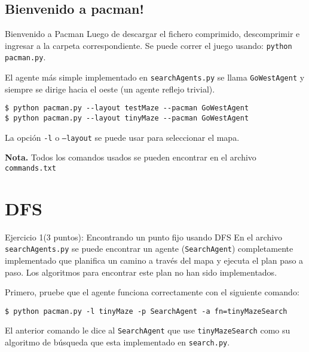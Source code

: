 \documentclass[10pt]{beamer}
\begin{document}
\subsection{Bienvenido a pacman!}

\begin{frame}[fragile]{Bienvenido a Pacman}
    Luego de descargar el fichero comprimido, descomprimir e ingresar a la carpeta correspondiente. 
Se puede correr el juego usando: \texttt{python pacman.py}.

El agente más simple implementado en \texttt{searchAgents.py} se llama \texttt{GoWestAgent} y siempre 
se dirige hacia el oeste (un agente reflejo trivial). 

\begin{lstlisting}
$ python pacman.py --layout testMaze --pacman GoWestAgent
$ python pacman.py --layout tinyMaze --pacman GoWestAgent
\end{lstlisting}

La opción \texttt{-l} o \texttt{--layout} se puede usar para seleccionar el mapa.

\textbf{Nota.} Todos los comandos usados se pueden encontrar en el archivo \texttt{commands.txt}
\end{frame}


\section{DFS}

\begin{frame}[fragile]{Ejercicio 1(3 puntos): Encontrando un punto fijo usando DFS}
En el archivo \texttt{searchAgents.py} se puede encontrar un agente (\texttt{SearchAgent}) 
completamente implementado que planifica un camino a través del mapa y ejecuta el plan paso 
a paso. Los algoritmos para encontrar este plan no han sido implementados.

Primero, pruebe que el agente funciona correctamente con el siguiente comando:

\begin{lstlisting}
$ python pacman.py -l tinyMaze -p SearchAgent -a fn=tinyMazeSearch
\end{lstlisting}

El anterior comando le dice al \texttt{SearchAgent} que use \texttt{tinyMazeSearch} como 
su algoritmo de búsqueda que esta implementado en \texttt{search.py}.
\end{frame}
\end{document}

